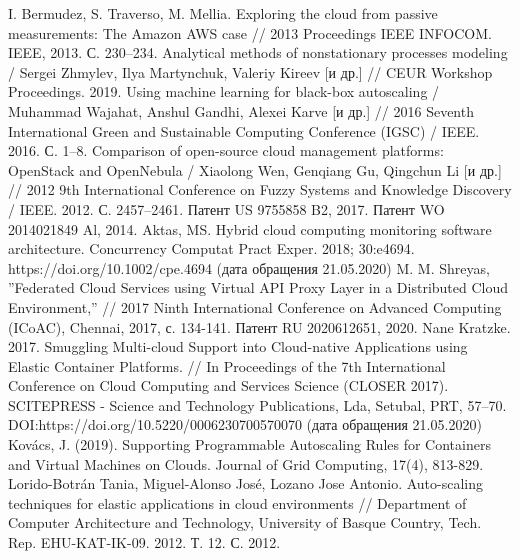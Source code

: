\begin{thebibliography}{40}
I. Bermudez, S. Traverso, M. Mellia. Exploring the cloud from passive measurements: The Amazon AWS case // 2013 Proceedings IEEE INFOCOM. IEEE, 2013. С. 230–234.
Analytical methods of nonstationary processes modeling / Sergei Zhmylev, Ilya Martynchuk, Valeriy Kireev [и др.] // CEUR Workshop Proceedings. 2019.
Using machine learning for black-box autoscaling / Muhammad Wajahat, Anshul Gandhi, Alexei Karve [и др.] // 2016 Seventh International Green and Sustainable Computing Conference (IGSC) / IEEE. 2016. С. 1–8.
Comparison of open-source cloud management platforms: OpenStack and OpenNebula / Xiaolong Wen, Genqiang Gu, Qingchun Li [и др.] // 2012 9th International Conference on Fuzzy Systems and Knowledge Discovery / IEEE. 2012. С. 2457–2461.
Патент US 9755858 B2, 2017.
Патент WO 2014021849 Al, 2014.
Aktas, MS. Hybrid cloud computing monitoring software architecture. Concurrency Computat Pract Exper. 2018; 30:e4694. https://doi.org/10.1002/cpe.4694 (дата обращения 21.05.2020)
M. M. Shreyas, ''Federated Cloud Services using Virtual API Proxy Layer in a Distributed Cloud Environment,'' // 2017 Ninth International Conference on Advanced Computing (ICoAC), Chennai, 2017, с. 134-141.
Патент RU 2020612651, 2020.
Nane Kratzke. 2017. Smuggling Multi-cloud Support into Cloud-native Applications using Elastic Container Platforms. // In Proceedings of the 7th International Conference on Cloud Computing and Services Science (CLOSER 2017). SCITEPRESS - Science and Technology Publications, Lda, Setubal, PRT, 57–70. DOI:https://doi.org/10.5220/0006230700570070 (дата обращения 21.05.2020) 
Kovács, J. (2019). Supporting Programmable Autoscaling Rules for Containers and Virtual Machines on Clouds. Journal of Grid Computing, 17(4), 813-829.
Lorido-Botrán Tania, Miguel-Alonso José, Lozano Jose Antonio. Auto-scaling techniques for elastic applications in cloud environments // Department of Computer Architecture and Technology, University of Basque Country, Tech. Rep. EHU-KAT-IK-09. 2012. Т. 12. С. 2012.

\end{thebibliography}
